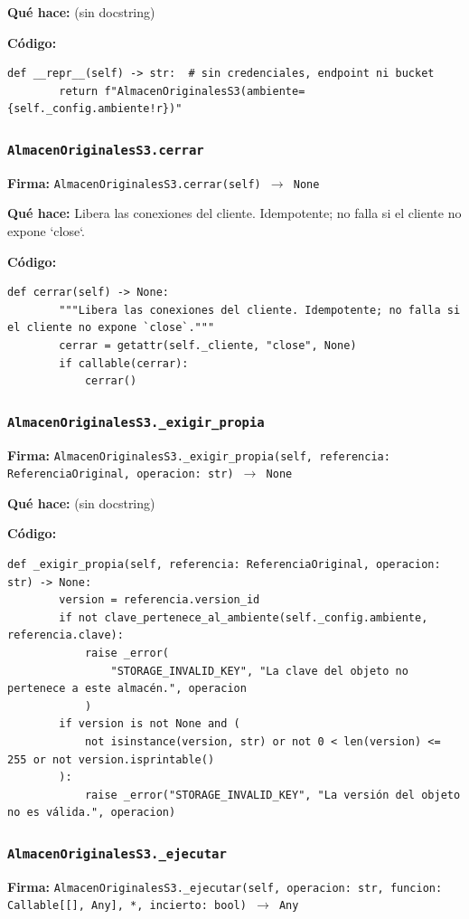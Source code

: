 \documentclass[11pt,a4paper]{article}
\begin{document}
\textbf{Qué hace:} (sin docstring)

\textbf{Código:}
\begin{lstlisting}
def __repr__(self) -> str:  # sin credenciales, endpoint ni bucket
        return f"AlmacenOriginalesS3(ambiente={self._config.ambiente!r})"
\end{lstlisting}

\subsubsection*{\texttt{AlmacenOriginalesS3.cerrar}}
\textbf{Firma:} \texttt{AlmacenOriginalesS3.cerrar(self) $\rightarrow$ None}

\textbf{Qué hace:} Libera las conexiones del cliente. Idempotente; no falla si el cliente no expone `close`.

\textbf{Código:}
\begin{lstlisting}
def cerrar(self) -> None:
        """Libera las conexiones del cliente. Idempotente; no falla si el cliente no expone `close`."""
        cerrar = getattr(self._cliente, "close", None)
        if callable(cerrar):
            cerrar()
\end{lstlisting}

\subsubsection*{\texttt{AlmacenOriginalesS3.\_exigir\_propia}}
\textbf{Firma:} \texttt{AlmacenOriginalesS3.\_exigir\_propia(self, referencia: ReferenciaOriginal, operacion: str) $\rightarrow$ None}

\textbf{Qué hace:} (sin docstring)

\textbf{Código:}
\begin{lstlisting}
def _exigir_propia(self, referencia: ReferenciaOriginal, operacion: str) -> None:
        version = referencia.version_id
        if not clave_pertenece_al_ambiente(self._config.ambiente, referencia.clave):
            raise _error(
                "STORAGE_INVALID_KEY", "La clave del objeto no pertenece a este almacén.", operacion
            )
        if version is not None and (
            not isinstance(version, str) or not 0 < len(version) <= 255 or not version.isprintable()
        ):
            raise _error("STORAGE_INVALID_KEY", "La versión del objeto no es válida.", operacion)
\end{lstlisting}

\subsubsection*{\texttt{AlmacenOriginalesS3.\_ejecutar}}
\textbf{Firma:} \texttt{AlmacenOriginalesS3.\_ejecutar(self, operacion: str, funcion: Callable[[], Any], *, incierto: bool) $\rightarrow$ Any}
\end{document}
